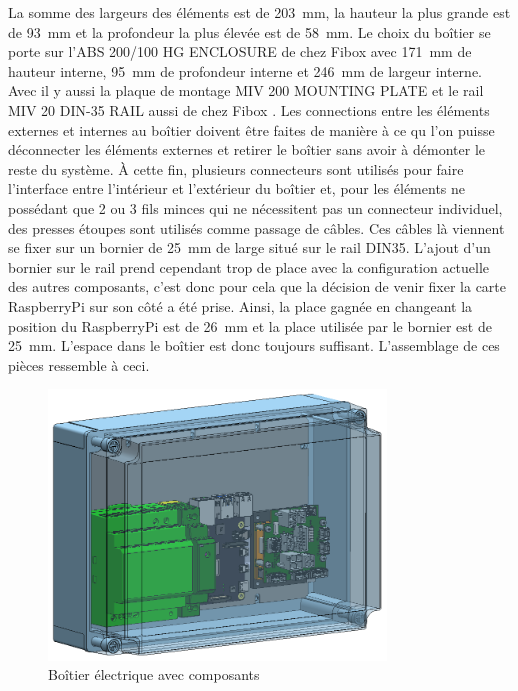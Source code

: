 La somme des largeurs des éléments est de 203~mm, la hauteur la plus grande est de 93~mm et la profondeur la plus élevée est de 58~mm. Le choix
du boîtier se porte sur l'ABS 200/100 HG ENCLOSURE de chez Fibox \cite{Fibox} avec 171~mm de hauteur interne, 95~mm de profondeur interne et
246~mm de largeur interne. Avec il y aussi la plaque de montage MIV 200 MOUNTING PLATE et le rail MIV 20 DIN-35 RAIL aussi de chez Fibox \cite{Fibox}.
Les connections entre les éléments externes et internes au boîtier doivent être faites de manière à ce qu l'on puisse déconnecter les éléments
externes et retirer le boîtier sans avoir à démonter le reste du système. À cette fin, plusieurs connecteurs sont utilisés pour faire l'interface
entre l'intérieur et l'extérieur du boîtier et, pour les éléments ne possédant que 2 ou 3 fils minces qui ne nécessitent pas un connecteur
individuel, des presses étoupes sont utilisés comme passage de câbles. Ces câbles là viennent se fixer sur un bornier de 25~mm de large situé
sur le rail DIN35. L'ajout d'un bornier sur le rail prend cependant trop de place avec la configuration actuelle des autres composants, c'est
donc pour cela que la décision de venir fixer la carte RaspberryPi sur son côté a été prise. Ainsi, la place gagnée en changeant la position du
RaspberryPi est de 26~mm et la place utilisée par le bornier est de 25~mm. L'espace dans le boîtier est donc toujours suffisant.
L'assemblage de ces pièces ressemble à ceci.

\begin{figure}[H]
  \centering
  \includegraphics[width = 0.8\textwidth]{assets/figures/AssemblageBoitierElectrique.png}
  \caption{Boîtier électrique avec composants}
  \label{fig:AssBoitierElec}
\end{figure}